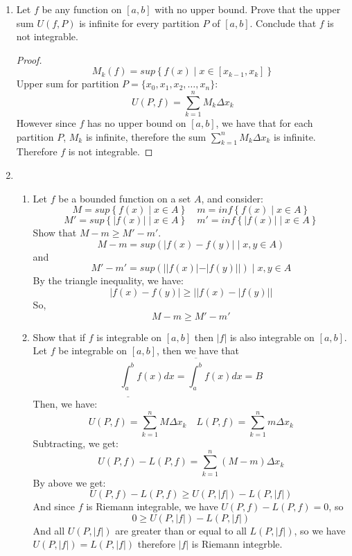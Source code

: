\documentclass[hidelinks,12pt]{article}
\title{\scalebox{2}{Math 524 Homework 3}}
\author{\scalebox{1.5}{Theo Koss}}
\date{March 2024}
\renewcommand{\geq}{\geqslant}
\begin{document}
\maketitle
\begin{enumerate}
    \item Let $f$ be any function on $[a,b]$ with no upper bound. Prove that the upper sum $U(f,P)$ is infinite for every partition $P$ of $[a,b]$. Conclude that $f$ is not integrable.
        \begin{proof}
            \[M_k(f)=sup\left\{f(x)\mid x\in[x_{k-1},x_k]\right\}\]
            Upper sum for partition $P=\{x_0,x_1,x_2,\dots,x_n\}$:
            \[U(P,f)=\sum_{k=1}^nM_k\Delta x_k\]
            However since $f$ has no upper bound on $[a,b]$, we have that for each partition $P$, $M_k$ is infinite, therefore the sum $\sum_{k=1}^nM_k\Delta x_k$ is infinite. Therefore $f$ is not integrable.
        \end{proof}
    \item \begin{enumerate}
            \item Let $f$ be a bounded function on a set $A$, and consider:
                \[M=sup\left\{f(x)\mid x\in A\right\}\quad m=inf\left\{f(x)\mid x\in A\right\}\]
                \[M'=sup\left\{|f(x)|\mid x\in A\right\}\quad m'=inf\left\{|f(x)|\mid x\in A\right\}\]
                Show that $M-m\geq M'-m'$.
                \[M-m=sup(|f(x)-f(y)|\mid x,y\in A)\]
                and
                \[M'-m'=sup(||f(x)|-|f(y)||)\mid x,y\in A\]
                By the triangle inequality, we have:
                \[|f(x)-f(y)|\geq||f(x)-|f(y)||\]
                So,
                \[M-m\geq M'-m'\]
            \item Show that if $f$ is integrable on $[a,b]$ then $|f|$ is also integrable on $[a,b]$.
                Let $f$ be integrable on $[a,b]$, then we have that
                \[\underline{\int_a^b} f(x) d x=\overline{\int_a^b} f(x) d x=B\tag{Where B is a real number}\]
                Then, we have:
                \[U(P,f)=\sum_{k=1}^nM\Delta x_k\quad L(P,f)=\sum_{k=1}^nm\Delta x_k\]
                Subtracting, we get:
                \[U(P,f)-L(P,f)=\sum_{k=1}^n(M-m)\Delta x_k\]
                By above we get:
                \[U(P,f)-L(P,f)\geq U(P,|f|)-L(P,|f|)\]
                And since $f$ is Riemann integrable, we have $U(P,f)-L(P,f)=0$, so
                \[0\geq U(P,|f|)-L(P,|f|)\]
                And all $U(P,|f|)$ are greater than or equal to all $L(P,|f|)$, so we have $U(P,|f|)=L(P,|f|)$ therefore $|f|$ is Riemann integrble.

\end{enumerate}
\end{enumerate}
\end{document}
